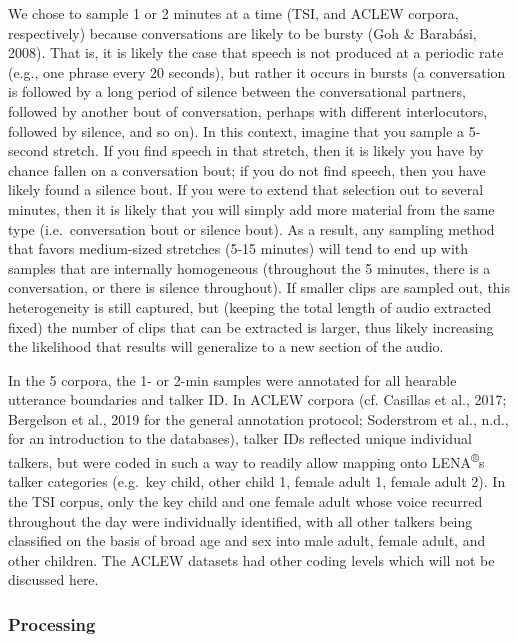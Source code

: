 \documentclass[english,table,man,floatsintext]{apa6}
\begin{document}
We chose to sample 1 or 2 minutes at a time (TSI, and ACLEW corpora, respectively) because conversations are likely to be bursty (Goh \& Barabási, 2008). That is, it is likely the case that speech is not produced at a periodic rate (e.g., one phrase every 20 seconds), but rather it occurs in bursts (a conversation is followed by a long period of silence between the conversational partners, followed by another bout of conversation, perhaps with different interlocutors, followed by silence, and so on). In this context, imagine that you sample a 5-second stretch. If you find speech in that stretch, then it is likely you have by chance fallen on a conversation bout; if you do not find speech, then you have likely found a silence bout. If you were to extend that selection out to several minutes, then it is likely that you will simply add more material from the same type (i.e.~conversation bout or silence bout). As a result, any sampling method that favors medium-sized stretches (5-15 minutes) will tend to end up with samples that are internally homogeneous (throughout the 5 minutes, there is a conversation, or there is silence throughout). If smaller clips are sampled out, this heterogeneity is still captured, but (keeping the total length of audio extracted fixed) the number of clips that can be extracted is larger, thus likely increasing the likelihood that results will generalize to a new section of the audio.

In the 5 corpora, the 1- or 2-min samples were annotated for all hearable utterance boundaries and talker ID. In ACLEW corpora (cf. Casillas et al., 2017; Bergelson et al., 2019 for the general annotation protocol; Soderstrom et al., n.d., for an introduction to the databases),
talker IDs reflected unique individual talkers, but were coded in such a way to readily allow mapping onto LENA\textsuperscript{®}s talker categories (e.g.~key child, other child 1, female adult 1, female adult 2). In the TSI corpus, only the key child and one female adult whose voice recurred throughout the day were individually identified, with all other talkers being classified on the basis of broad age and sex into male adult, female adult, and other children. The ACLEW datasets had other coding levels which will not be discussed here.

\hypertarget{processing}{%
\subsubsection{Processing}\label{processing}}
\end{document}
